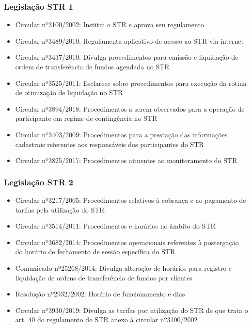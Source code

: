 \documentclass[10pt]{beamer}
\begin{document}
\begin{frame} 
\frametitle{Legislação STR 1}

\begin{itemize}
\item Circular nº3100/2002: Institui o STR e aprova seu regulamento
\item Circular nº3489/2010: Regulamenta aplicativo de acesso ao STR via internet
\item Circular nº3437/2010: Divulga procedimentos para emissão e liquidação de ordem de transferência de fundos agendada no STR
\item Circular nº3525/2011: Esclarece sobre procedimentos para execução da rotina de otimização de liquidação no STR
\item Circular nº3894/2018: Procedimentos a serem observados para a operação de participante em regime de contingência no STR
\item Circular nº3403/2009: Procedimentos para a prestação das informações cadastrais referentes aos responsáveis dos participantes do STR
\item Circular nº3825/2017: Procedimentos atinentes ao monitoramento do STR
\end{itemize}
\end{frame}

\begin{frame} 
\frametitle{Legislação STR 2}

\begin{itemize}
\item Circular nº3217/2005: Procedimentos relativos à cobrança e ao pagamento de tarifas pela utilização do STR
\item Circular nº3514/2011: Procedimentos e horários no âmbito do STR
\item Circular nº3682/2014: Procedimentos operacionais referentes à postergação do horário de fechamento de sessão específica do STR
\item Comunicado nº25268/2014: Divulga alteração de horários para registro e liquidação de ordens de transferência de fundos por clientes
\item Resolução nº2932/2002: Horário de funcionamento e dias
\item Circular nº3930/2019: Divulga as tarifas por utilização do STR de que trata o art. 40 do regulamento do STR anexo à circular nº3100/2002
\end{itemize}
\end{frame}
\end{document}
